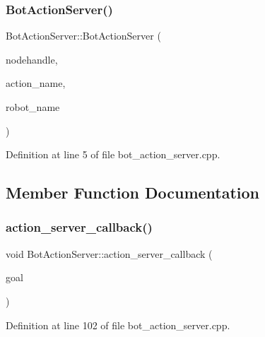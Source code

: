 \subsubsection{\texorpdfstring{Bot\+Action\+Server()}{BotActionServer()}}
{\footnotesize\ttfamily Bot\+Action\+Server\+::\+Bot\+Action\+Server (\begin{DoxyParamCaption}\item[{ros\+::\+Node\+Handle $\ast$}]{nodehandle,  }\item[{std\+::string}]{action\+\_\+name,  }\item[{std\+::string}]{robot\+\_\+name }\end{DoxyParamCaption})}



Definition at line 5 of file bot\+\_\+action\+\_\+server.\+cpp.



\subsection{Member Function Documentation}
\mbox{\label{class_bot_action_server_a48f2c8231440b5057b2685c319d83515}} 
\subsubsection{\texorpdfstring{action\+\_\+server\+\_\+callback()}{action\_server\_callback()}}
{\footnotesize\ttfamily void Bot\+Action\+Server\+::action\+\_\+server\+\_\+callback (\begin{DoxyParamCaption}\item[{const actionlib\+::\+Simple\+Action\+Server$<$ bot\+\_\+msgs\+::\+Move\+Bot\+Action $>$\+::Goal\+Const\+Ptr \&}]{goal }\end{DoxyParamCaption})}



Definition at line 102 of file bot\+\_\+action\+\_\+server.\+cpp.

\mbox{\label{class_bot_action_server_af24acb7dc4e73c24a4c913fd6a521bf0}} 

